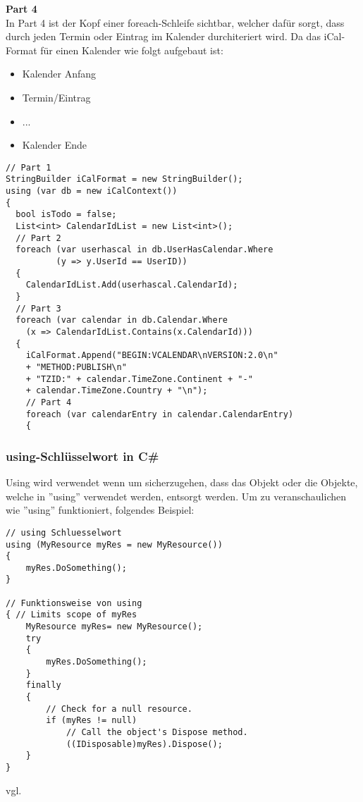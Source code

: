 \textbf{Part 4} \\
In Part 4 ist der Kopf einer foreach-Schleife sichtbar, welcher dafür sorgt, dass durch jeden Termin oder Eintrag im Kalender durchiteriert wird. Da das iCal-Format für einen Kalender wie folgt aufgebaut ist: 
\begin{itemize}
\item Kalender Anfang
\item Termin/Eintrag
\item ...
\item Kalender Ende
\end{itemize}

\begin{lstlisting}[caption=Parser Verbindung zur DB mit dem Entity Framework, label=lst:test]
// Part 1
StringBuilder iCalFormat = new StringBuilder();
using (var db = new iCalContext())
{
  bool isTodo = false;
  List<int> CalendarIdList = new List<int>();
  // Part 2
  foreach (var userhascal in db.UserHasCalendar.Where
  		  (y => y.UserId == UserID))
  {
	CalendarIdList.Add(userhascal.CalendarId);
  }
  // Part 3
  foreach (var calendar in db.Calendar.Where
  	(x => CalendarIdList.Contains(x.CalendarId)))
  {
    iCalFormat.Append("BEGIN:VCALENDAR\nVERSION:2.0\n"
	+ "METHOD:PUBLISH\n"
	+ "TZID:" + calendar.TimeZone.Continent + "-" 
	+ calendar.TimeZone.Country + "\n");
    // Part 4
    foreach (var calendarEntry in calendar.CalendarEntry)
    {
\end{lstlisting} 
\subsubsection{using-Schlüsselwort in C\#}
\label{usingkeyword}
Using wird verwendet wenn um sicherzugehen, dass das Objekt oder die Objekte, welche in ''using'' verwendet werden, entsorgt werden. Um zu veranschaulichen wie ''using'' funktioniert, folgendes Beispiel:

\begin{lstlisting}[caption=Parser funktionsweise von using, label=lst:test]
// using Schluesselwort
using (MyResource myRes = new MyResource())
{
    myRes.DoSomething();
}
 
// Funktionsweise von using 
{ // Limits scope of myRes
    MyResource myRes= new MyResource();
    try
    {
        myRes.DoSomething();
    }
    finally
    {
        // Check for a null resource.
        if (myRes != null)
            // Call the object's Dispose method.
            ((IDisposable)myRes).Dispose();
    }
}
\end{lstlisting} 
vgl. \cite{ParserUsingKeyword}
